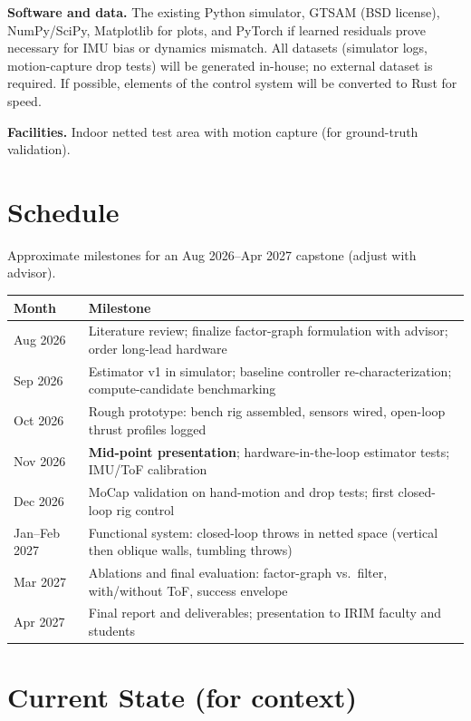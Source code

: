 \documentclass[11pt]{article}
\begin{document}
\textbf{Software and data.} The existing Python simulator, GTSAM (BSD
license), NumPy/SciPy, Matplotlib for plots, and PyTorch if learned
residuals prove necessary for IMU bias or dynamics mismatch. All datasets
(simulator logs, motion-capture drop tests) will be generated in-house;
no external dataset is required. If possible, elements of the control system will be converted to Rust for speed.

\textbf{Facilities.} Indoor netted test area with motion capture (for
ground-truth validation).

\section{Schedule}

Approximate milestones for an Aug 2026--Apr 2027 capstone (adjust with advisor).

\begin{center}
\begin{tabular}{|p{}|p{}|}
\hline
\textbf{Month} & \textbf{Milestone} \\ \hline
Aug 2026      & Literature review; finalize factor-graph formulation with advisor; order long-lead hardware \\ \hline
Sep 2026      & Estimator v1 in simulator; baseline controller re-characterization; compute-candidate benchmarking \\ \hline
Oct 2026      & Rough prototype: bench rig assembled, sensors wired, open-loop thrust profiles logged \\ \hline
Nov 2026      & \textbf{Mid-point presentation}; hardware-in-the-loop estimator tests; IMU/ToF calibration \\ \hline
Dec 2026      & MoCap validation on hand-motion and drop tests; first closed-loop rig control \\ \hline
Jan--Feb 2027 & Functional system: closed-loop throws in netted space (vertical then oblique walls, tumbling throws) \\ \hline
Mar 2027      & Ablations and final evaluation: factor-graph vs.\ filter, with/without ToF, success envelope \\ \hline
Apr 2027      & Final report and deliverables; presentation to IRIM faculty and students \\ \hline
\end{tabular}
\end{center}

\section*{Current State (for context)}
\end{document}
